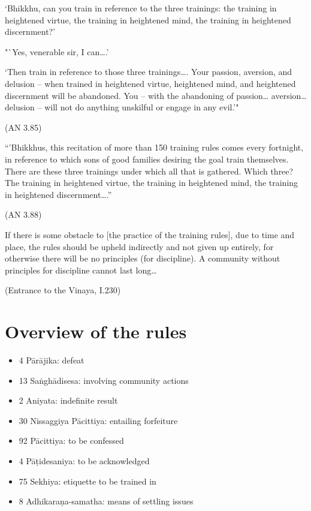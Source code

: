 `Bhikkhu, can you train in reference to the three trainings: the
training in heightened virtue, the training in heightened mind, the
training in heightened discernment?'

"`Yes, venerable sir, I can\ldots.'

`Then train in reference to those three trainings\ldots. Your passion,
aversion, and delusion -- when trained in heightened virtue, heightened
mind, and heightened discernment will be abandoned. You -- with the
abandoning of passion\ldots{} aversion\ldots{} delusion -- will not do
anything unskilful or engage in any evil.'"

(AN 3.85)

``'Bhikkhus, this recitation of more than 150 training rules comes every
fortnight, in reference to which sons of good families desiring the goal
train themselves. There are these three trainings under which all that
is gathered. Which three? The training in heightened virtue, the
training in heightened mind, the training in heightened
discernment\ldots.''

(AN 3.88)

If there is some obstacle to {[}the practice of the training rules{]},
due to time and place, the rules should be upheld indirectly and not
given up entirely, for otherwise there will be no principles (for
discipline). A community without principles for discipline cannot last
long\ldots{}

(Entrance to the Vinaya, I.230)

\section{Overview of the rules}

\begin{itemize}
\tightlist
\item
  4 Pārājika: defeat
\item
  13 Saṅghādisesa: involving community actions
\item
  2 Aniyata: indefinite result
\item
  30 Nissaggiya Pācittiya: entailing forfeiture
\item
  92 Pācittiya: to be confessed
\item
  4 Pāṭidesaniya: to be acknowledged
\item
  75 Sekhiya: etiquette to be trained in
\item
  8 Adhikaraṇa-samatha: means of settling issues
\end{itemize}

